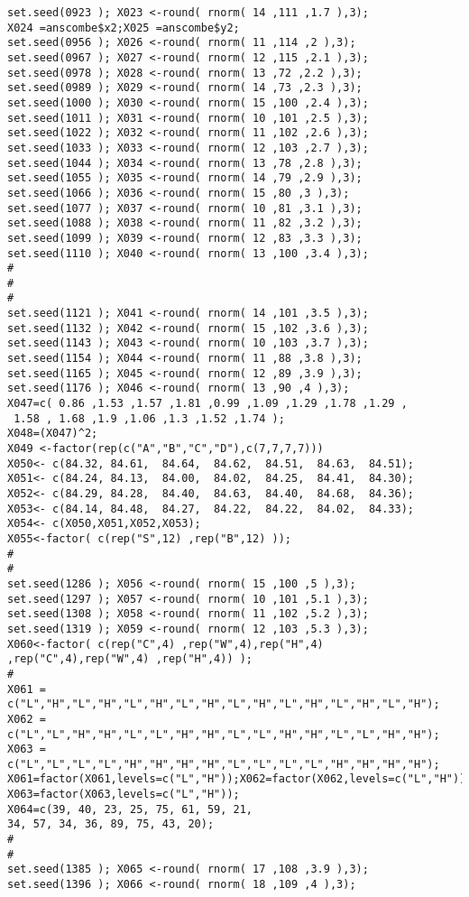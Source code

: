 \documentclass[]{article}
\begin{document}
\begin{verbatim}
set.seed(0923 ); X023 <-round( rnorm( 14 ,111 ,1.7 ),3);
X024 =anscombe$x2;X025 =anscombe$y2;
set.seed(0956 ); X026 <-round( rnorm( 11 ,114 ,2 ),3);
set.seed(0967 ); X027 <-round( rnorm( 12 ,115 ,2.1 ),3);
set.seed(0978 ); X028 <-round( rnorm( 13 ,72 ,2.2 ),3);
set.seed(0989 ); X029 <-round( rnorm( 14 ,73 ,2.3 ),3);
set.seed(1000 ); X030 <-round( rnorm( 15 ,100 ,2.4 ),3);
set.seed(1011 ); X031 <-round( rnorm( 10 ,101 ,2.5 ),3);
set.seed(1022 ); X032 <-round( rnorm( 11 ,102 ,2.6 ),3);
set.seed(1033 ); X033 <-round( rnorm( 12 ,103 ,2.7 ),3);
set.seed(1044 ); X034 <-round( rnorm( 13 ,78 ,2.8 ),3);
set.seed(1055 ); X035 <-round( rnorm( 14 ,79 ,2.9 ),3);
set.seed(1066 ); X036 <-round( rnorm( 15 ,80 ,3 ),3);
set.seed(1077 ); X037 <-round( rnorm( 10 ,81 ,3.1 ),3);
set.seed(1088 ); X038 <-round( rnorm( 11 ,82 ,3.2 ),3);
set.seed(1099 ); X039 <-round( rnorm( 12 ,83 ,3.3 ),3);
set.seed(1110 ); X040 <-round( rnorm( 13 ,100 ,3.4 ),3);
#
#
#
set.seed(1121 ); X041 <-round( rnorm( 14 ,101 ,3.5 ),3);
set.seed(1132 ); X042 <-round( rnorm( 15 ,102 ,3.6 ),3);
set.seed(1143 ); X043 <-round( rnorm( 10 ,103 ,3.7 ),3);
set.seed(1154 ); X044 <-round( rnorm( 11 ,88 ,3.8 ),3);
set.seed(1165 ); X045 <-round( rnorm( 12 ,89 ,3.9 ),3);
set.seed(1176 ); X046 <-round( rnorm( 13 ,90 ,4 ),3);
X047=c( 0.86 ,1.53 ,1.57 ,1.81 ,0.99 ,1.09 ,1.29 ,1.78 ,1.29 ,
 1.58 , 1.68 ,1.9 ,1.06 ,1.3 ,1.52 ,1.74 );
X048=(X047)^2; 
X049 <-factor(rep(c("A","B","C","D"),c(7,7,7,7)))
X050<- c(84.32,	84.61,	84.64,	84.62,	84.51,	84.63,	84.51);
X051<- c(84.24,	84.13,	84.00,	84.02,	84.25,	84.41,	84.30);	 
X052<- c(84.29,	84.28,	84.40,	84.63,	84.40,	84.68,	84.36);
X053<- c(84.14,	84.48,	84.27,	84.22,	84.22,	84.02,	84.33);
X054<- c(X050,X051,X052,X053);
X055<-factor( c(rep("S",12) ,rep("B",12) ));
#
#
set.seed(1286 ); X056 <-round( rnorm( 15 ,100 ,5 ),3);
set.seed(1297 ); X057 <-round( rnorm( 10 ,101 ,5.1 ),3);
set.seed(1308 ); X058 <-round( rnorm( 11 ,102 ,5.2 ),3);
set.seed(1319 ); X059 <-round( rnorm( 12 ,103 ,5.3 ),3);
X060<-factor( c(rep("C",4) ,rep("W",4),rep("H",4) ,rep("C",4),rep("W",4) ,rep("H",4)) );
#
X061 = c("L","H","L","H","L","H","L","H","L","H","L","H","L","H","L","H");
X062 = c("L","L","H","H","L","L","H","H","L","L","H","H","L","L","H","H");
X063 = c("L","L","L","L","H","H","H","H","L","L","L","L","H","H","H","H");
X061=factor(X061,levels=c("L","H"));X062=factor(X062,levels=c("L","H"));
X063=factor(X063,levels=c("L","H"));
X064=c(39, 40, 23, 25, 75, 61, 59, 21, 
34, 57, 34, 36, 89, 75, 43, 20);
#
#
set.seed(1385 ); X065 <-round( rnorm( 17 ,108 ,3.9 ),3);
set.seed(1396 ); X066 <-round( rnorm( 18 ,109 ,4 ),3);

\end{verbatim}
\end{document}
